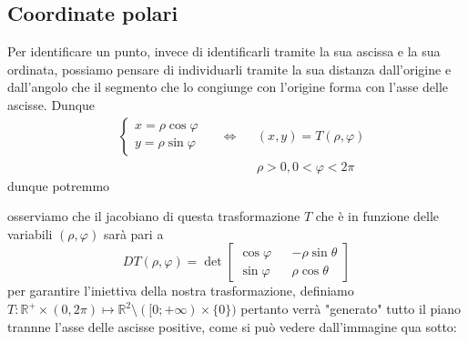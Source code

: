 \subsection{Coordinate polari}
Per identificare un punto, invece di identificarli tramite la sua ascissa e la sua ordinata, possiamo pensare di individuarli tramite la sua distanza dall'origine e dall'angolo che il segmento che lo congiunge con
l'origine forma con l'asse delle ascisse. Dunque
\[\begin{aligned}
&\begin{cases}
	x = \rho \cos{\varphi} \\
	y = \rho \sin{\varphi}
\end{cases} & &\iff & &(x, y) = T(\rho, \varphi) \\
& & & & &\rho > 0, 0 < \varphi < 2\pi
\end{aligned}\]
dunque potremmo 
\begin{figure}[H]
	\centering
\end{figure}
%
osserviamo che il jacobiano di questa trasformazione $T$ che è in funzione delle variabili $(\rho, \varphi)$ sarà pari a
$$
DT(\rho, \varphi) = \det \begin{bmatrix} \cos{\varphi} && -\rho \sin{\theta} \\
	\sin{\varphi} && \rho \cos{\theta}
\end{bmatrix} 
$$
per garantire l'iniettiva della nostra trasformazione, definiamo $T: \mathbb{R}^+ \times (0, 2\pi) \mapsto \mathbb{R}^2 \setminus ([0; +\infty) \times \{0\})$ pertanto verrà "generato" tutto il piano trannne l'asse delle ascisse positive, come si può vedere dall'immagine qua sotto:
\begin{figure}[H]
	\centering
\end{figure}
